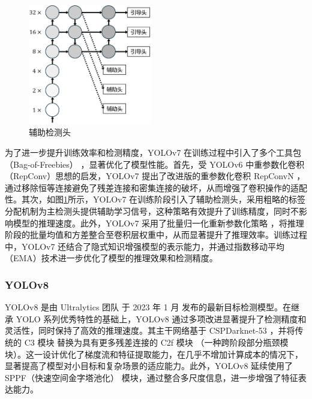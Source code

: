 \documentclass[11pt,twocolumn]{ctexart}
\begin{document}
\begin{figure}[!hbtp]
  \begin{center}
  \includegraphics[width=0.48\textwidth]{figure/辅助检测头}
    \end{center}
  \caption{辅助检测头}
  \label{辅助检测头}
\end{figure}

为了进一步提升训练效率和检测精度，YOLOv7 在训练过程中引入了多个工具包（Bag-of-Freebies） ，显著优化了模型性能。首先，受 YOLOv6 中重参数化卷积（RepConv）思想的启发，YOLOv7 提出了改进版的重参数化卷积 RepConvN ，通过移除恒等连接避免了残差连接和密集连接的破坏，从而增强了卷积操作的适配性。其次，如图\ref{辅助检测头}所示，YOLOv7 在训练阶段引入了辅助检测头，采用粗略的标签分配机制为主检测头提供辅助学习信号，这种策略有效提升了训练精度，同时不影响模型的推理速度。此外，YOLOv7 采用了批量归一化重新参数化策略 ，将推理阶段的批量均值和方差整合至卷积层权重中，从而显著提升了推理效率。训练过程中，YOLOv7 还结合了隐式知识增强模型的表示能力，并通过指数移动平均（EMA）技术进一步优化了模型的推理效果和检测精度。

\subsubsection{YOLOv8}
YOLOv8\cite{yolov8} 是由 Ultralytics 团队 于 2023 年 1 月 发布的最新目标检测模型。在继承 YOLO 系列优秀特性的基础上，YOLOv8 通过多项改进显著提升了检测精度和灵活性，同时保持了高效的推理速度。其主干网络基于 CSPDarknet-53 ，并将传统的 C3 模块 替换为具有更多残差连接的 C2f 模块 （一种跨阶段部分瓶颈模块）。这一设计优化了梯度流和特征提取能力，在几乎不增加计算成本的情况下，显著提高了模型对小目标和复杂场景的适应能力。此外，YOLOv8 延续使用了 SPPF（快速空间金字塔池化） 模块，通过整合多尺度信息，进一步增强了特征表达能力。
\end{document}
